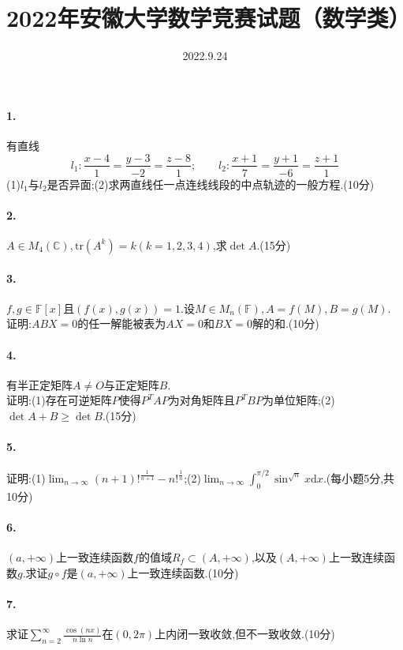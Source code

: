 \documentclass[UTF8]{article}
\begin{document}
\title{2022年安徽大学数学竞赛试题（数学类）}
\date{2022.9.24}
\maketitle
\paragraph*{1.}有直线$$l_1:\frac{x-4}{1}=\frac{y-3}{-2}=\frac{z-8}{1};\qquad l_2:\frac{x+1}{7}=\frac{y+1}{-6}=\frac{z+1}{1}$$
(1)$l_1$与$l_2$是否异面;(2)求两直线任一点连线线段的中点轨迹的一般方程.(10分)

\paragraph*{2.}$A\in M_4(\mathbb{C}), \mathrm{tr}(A^k)=k (k=1,2,3,4)$,求$\det A$.(15分)

\paragraph*{3.}$f,g\in \mathbb{F}[x]$且$(f(x),g(x))=1$.设$M\in M_n(\mathbb{F}),A=f(M),B=g(M)$.\\ 证明:$ABX=0$的任一解能被表为$AX=0$和$BX=0$解的和.(10分)

\paragraph*{4.}有半正定矩阵$A\neq O$与正定矩阵$B$.\\ 证明:(1)存在可逆矩阵$P$使得$P^TAP$为对角矩阵且$P^TBP$为单位矩阵;(2)$\det A+B\geq \det B$.(15分)

\paragraph*{5.}证明:(1)$\displaystyle \lim_{n\to \infty}(n+1)!^{\frac{1}{n+1}}-n!^{\frac{1}{n}}$;(2)$\displaystyle \lim_{n\to \infty}\int_0^{\pi/2}\sin^{\sqrt{n}}x \mathrm{d}x$.(每小题5分,共10分)

\paragraph*{6.}$(a,+\infty)$上一致连续函数$f$的值域$R_f\subset (A,+\infty)$,以及$(A,+\infty)$上一致连续函数$g$.求证$g\circ f$是$(a,+\infty)$上一致连续函数.(10分)

\paragraph*{7.}求证$\displaystyle \sum_{n=2}^\infty \frac{\cos(nx)}{n\ln n}$在$(0,2\pi)$上内闭一致收敛,但不一致收敛.(10分)
\end{document}
